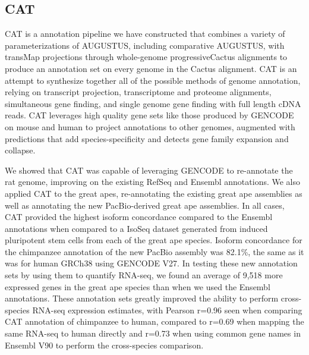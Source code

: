 \documentclass[fleqn,10pt]{wlscirep}
\begin{document}
\subsection{CAT}
CAT is a annotation pipeline we have constructed that combines a variety of parameterizations of AUGUSTUS, including comparative AUGUSTUS, with transMap projections through whole-genome progressiveCactus alignments to produce an annotation set on every genome in the Cactus alignment. CAT is an attempt to synthesize together all of the possible methods of genome annotation, relying on transcript projection, transcriptome and proteome alignments, simultaneous gene finding, and single genome gene finding with full length cDNA reads. CAT leverages high quality gene sets like those produced by GENCODE on mouse and human to project annotations to other genomes, augmented with predictions that add species-specificity and detects gene family expansion and collapse. 

We showed that CAT was capable of leveraging GENCODE to re-annotate the rat genome, improving on the existing RefSeq and Ensembl annotations. We also applied CAT to the great apes, re-annotating the existing great ape assemblies as well as annotating the new PacBio-derived great ape assemblies. In all cases, CAT provided the highest isoform concordance compared to the Ensembl annotations when compared to a IsoSeq dataset generated from induced pluripotent stem cells from each of the great ape species. Isoform concordance for the chimpanzee annotation of the new PacBio assembly was 82.1\%, the same as it was for human GRCh38 using GENCODE V27. In testing these new annotation sets by using them to quantify RNA-seq, we found an average of 9,518 more expressed genes in the great ape species than when we used the Ensembl annotations. These annotation sets greatly improved the ability to perform cross-species RNA-seq expression estimates, with Pearson r=0.96 seen when comparing CAT annotation of chimpanzee to human, compared to r=0.69 when mapping the same RNA-seq to human directly and r=0.73 when using common gene names in Ensembl V90 to perform the cross-species comparison.
\end{document}
